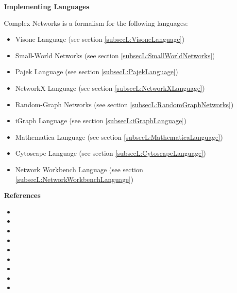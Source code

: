 \textbf{Implementing Languages}

Complex Networks is a formalism for the following languages:
\begin{itemize}
	\item Visone Language (see section \ref{subsecL:VisoneLanguage})
	\item Small-World Networks (see section \ref{subsecL:SmallWorldNetworks})
	\item Pajek Language (see section \ref{subsecL:PajekLanguage})
	\item NetworkX Language (see section \ref{subsecL:NetworkXLanguage})
	\item Random-Graph Networks (see section \ref{subsecL:RandomGraphNetworks})
	\item iGraph Language (see section \ref{subsecL:iGraphLanguage})
	\item Mathematica Language (see section \ref{subsecL:MathematicaLanguage})
	\item Cytoscape Language (see section \ref{subsecL:CytoscapeLanguage})
	\item Network Workbench Language (see section \ref{subsecL:NetworkWorkbenchLanguage})
\end{itemize}





\textbf{References}
\begin{itemize}
	
\item {}
	
\item {}
	
\item {}
	
\item {}
	
\item {}
	
\item {}
	
\item {}
	
\item {}
	
\item {}
\end{itemize}



